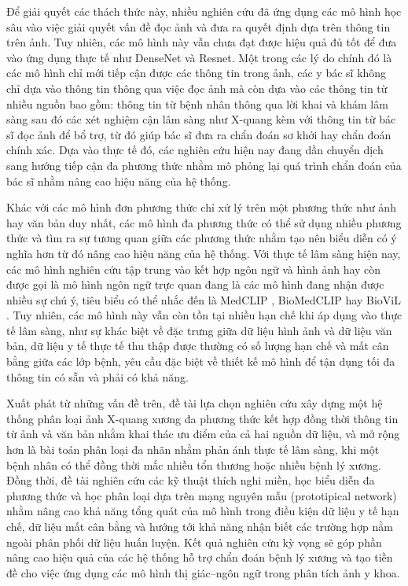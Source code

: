 Để giải quyết các thách thức này, nhiều nghiên cứu đã ứng dụng các mô hình học sâu vào việc 
giải quyết vấn đề đọc ảnh và đưa ra quyết định dựa trên thông tin trên ảnh. Tuy nhiên, 
các mô hình này vẫn chưa đạt được hiệu quả đủ tốt để đưa vào ứng dụng thực tế như DenseNet và Resnet. 
Một trong các lý do chính đó là các mô hình chỉ mới tiếp cận được các thông tin trong ảnh, 
các y bác sĩ không chỉ dựa vào thông tin thông qua việc đọc ảnh mà còn dựa vào các thông tin từ nhiều nguồn bao gồm: 
thông tin từ bệnh nhân thông qua lời khai và khám lâm sàng sau đó các xét nghiệm cận lâm sàng 
như X-quang kèm với thông tin từ bác sĩ đọc ảnh để bổ trợ, từ đó giúp bác sĩ đưa ra chẩn đoán sơ khởi hay chẩn đoán chính xác. 
Dựa vào thực tế đó, các nghiên cứu hiện nay đang dần chuyển dịch sang hướng tiếp cận đa phương thức nhằm mô phỏng lại 
quá trình chẩn đoán của bác sĩ nhằm nâng cao hiệu năng của hệ thống.

Khác với các mô hình đơn phương thức chỉ xử lý trên một phương thức như ảnh hay văn bản duy nhất, 
các mô hình đa phương thức có thể sử dụng nhiều phương thức và tìm ra sự tương quan giữa các phương thức 
nhằm tạo nên biểu diễn có ý nghĩa hơn từ đó nâng cao hiệu năng của hệ thống. 
Với thực tế lâm sàng hiện nay, các mô hình nghiên cứu tập trung vào kết hợp ngôn ngữ và hình ảnh 
hay còn được gọi là mô hình ngôn ngữ trực quan đang là các mô hình đang nhận được nhiều sự chú ý, 
tiêu biểu có thể nhắc đến là MedCLIP \cite{MedCLIP}, BioMedCLIP \cite{BiomedCLIP} hay BioViL \cite{BioViL}. 
Tuy nhiên, các mô hình này vẫn còn tồn tại nhiều hạn chế khi áp dụng vào thực tế lâm sàng, 
như sự khác biệt về đặc trưng giữa dữ liệu hình ảnh và dữ liệu văn bản, 
dữ liệu y tế thực tế thu thập được thường có số lượng hạn chế và mất cân bằng giữa các lớp bệnh, 
yêu cầu đặc biệt về thiết kế mô hình để tận dụng tối đa thông tin có sẵn và phải có khả năng.

Xuất phát từ những vấn đề trên, đề tài lựa chọn nghiên cứu xây dựng một hệ thống phân loại ảnh X-quang xương đa phương thức 
kết hợp đồng thời thông tin từ ảnh và văn bản nhằm khai thác ưu điểm của cả hai nguồn dữ liệu, 
và mở rộng hơn là bài toán phân loại đa nhãn nhằm phản ánh thực tế lâm sàng, 
khi một bệnh nhân có thể đồng thời mắc nhiều tổn thương hoặc nhiều bệnh lý xương. 
Đồng thời, đề tài nghiên cứu các kỹ thuật thích nghi miền, 
học biểu diễn đa phương thức và học phân loại dựa trên mạng nguyên mẫu (prototipical network) 
nhằm nâng cao khả năng tổng quát của mô hình trong điều kiện 
dữ liệu y tế hạn chế, dữ liệu mất cân bằng và hướng tới khả năng nhận biết các trường hợp nằm ngoài phân phối dữ liệu huấn luyện. 
Kết quả nghiên cứu kỳ vọng sẽ góp phần nâng cao hiệu quả của các hệ thống hỗ trợ chẩn đoán bệnh lý xương và tạo tiền đề cho việc 
ứng dụng các mô hình thị giác–ngôn ngữ trong phân tích ảnh y khoa.

